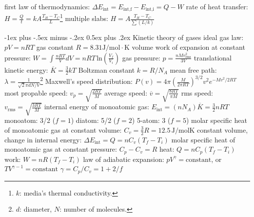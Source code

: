 \documentclass[10pt,landscape]{article}
\makeatletter
\renewcommand{\subsection}{\@startsection{subsection}{2}{0mm}%
                                {-1ex plus -.5ex minus -.2ex}%
                                {0.5ex plus .2ex}%
                                {\normalfont\normalsize\bfseries}}
\newcommand{\spc}{\hspace*{1em}}
\makeatother
\begin{document}
\begin{multicols*}{3}
first law of thermodynamics: $\Delta E_\textrm{int}=E_{\textrm{int,f}}-E_{\textrm{int,i}}=Q-W$
\newline
rate of heat transfer: $H=\frac{Q}{t}=kA\frac{T_H-T_C}{L}$\footnote{$k$: media's thermal conductivity.}
\newline
\spc multiple slabs: $H=A\frac{T_H-T_C}{\sum (L/k)}$

\subsection{Kinetic theory of gases}
ideal gas law: $pV=nRT$
\newline 
gas constant $R=8.31\textrm{J}/\textrm{mol}\cdot \textrm{K}$
\newline
volume work of expansion at constant pressure: $W=\int \frac{nRT}{V}dV=nRT \, \mathrm{ln}(\frac{V_f}{V_i})$
\newline
gas pressure: $p=\frac{nMv_{\textrm{rms}}^2}{3V}$
\newline
translational kinetic energy: $\overline{K}=\frac{3}{2}kT$
\newline 
Boltzman constant $k=R/N_A$
\newline
mean free path: $\lambda =\frac{1}{\sqrt{2}\pi dN/V}$\footnote{$d$: diameter, $N$: number of molecules.}
\newline
Maxwell's speed distribution: $P(v)=4\pi (\frac{M}{2 \pi RT})^{3/2}v^2e^{-Mv^2/2RT}$
\newline
\spc most propable speed: $v_p=\sqrt{\frac{2RT}{M}}$
\newline
\spc average speed: $\overline{v}=\sqrt{\frac{8RT}{\pi M}}$
\newline
\spc rms speed: $v_{\mathrm{rms}}=\sqrt{\frac{3RT}{M}}$
\newline
internal energy of monoatomic gas: $E_{\mathrm{int}}=(nN_A)\overline{K}=\frac{3}{2}nRT$
\newline
\spc monoatom: 3/2 ($f=1$)
\newline 
\spc diatom: 5/2 ($f=2$)
\newline
\spc 5-atom: 3 ($f=5$)
\newline
molar specific heat of monoatomic gas at constant volume: $C_v=\frac{3}{2}R=12.5\,\textrm{J/molK}$
\newline
\spc constant volume, change in internal energy: 
\newline
\spc $\Delta E_{\textrm{int}}=Q=nC_v(T_f-T_i)$
\newline
molar specific heat of monoatomic gas at constant pressure: $C_p-C_v=R$
\newline
\spc heat: $Q=nC_p(T_f-T_i)$
\newline
\spc work: $W=nR(T_f-T_i)$
\newline
law of adiabatic expansion: $pV^\gamma =\textrm{constant}$, or $TV^{\gamma -1}=\textrm{constant}$
\newline
\spc $\gamma =C_p/C_v=1+2/f$


\end{multicols*}
\end{document}
